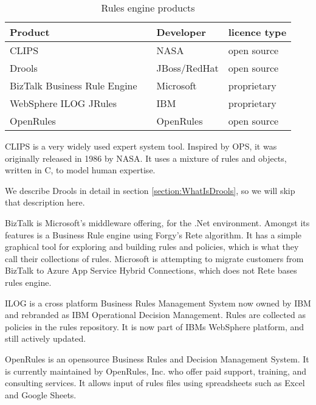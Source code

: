 \begin{table}[h]
    \begin{center}
        \begin{tabular}{ |l c |l|l| } 
            \hline
            Product                      &                             & Developer    & licence type   \\
            \hline
            CLIPS                        &\cite{CLIPSProductPage}      & NASA         & open source    \\ 
            Drools                       &\cite{DroolsProductPage}     & JBoss/RedHat & open source    \\ 
            BizTalk Business Rule Engine &\cite{BiztalkProductPage}    & Microsoft    & proprietary    \\ 
            WebSphere ILOG JRules        &\cite{JRulesProductPage}     & IBM          & proprietary    \\ 
            OpenRules                    &\cite{OpenRulesProductPage}  & OpenRules    & open source    \\ 
            \hline
        \end{tabular}
    \end{center}
    \caption{Rules engine products}
    \label{table:RuleEngines}
\end{table}

CLIPS is a very widely used expert system tool. 
Inspired by OPS, it was originally released in 1986 by NASA. 
It uses a mixture of rules and objects, written in C, to model human expertise.

We describe Drools in detail in section \ref{section:WhatIsDrools}, so we will skip that description here.

BizTalk is Microsoft's middleware offering, for the .Net environment. 
Amongst its features is a Business Rule engine using Forgy's Rete algorithm.
It has a simple graphical tool for exploring and building rules and policies, which is what they call their collections of rules.
Microsoft is attempting to migrate customers from BizTalk to Azure App Service Hybrid Connections, which does not Rete bases rules engine.

ILOG is a cross platform Business Rules Management System now owned by IBM and rebranded as IBM Operational Decision Management.
Rules are collected as policies in the rules repository.
It is now part of IBMs WebSphere platform, and still actively updated.

OpenRules is an opensource Business Rules and Decision Management System. 
It is currently maintained by OpenRules, Inc. who offer paid support, training, and consulting services.
It allows input of rules files using spreadsheets such as Excel and Google Sheets.



